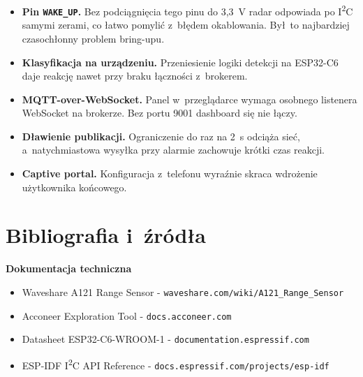 \documentclass[11pt,a4paper]{article}
\begin{document}
\begin{itemize}[leftmargin=1.4em]
  \item \textbf{Pin \texttt{WAKE\_UP}.} Bez podci\k agni\k ecia tego pinu do 3,3~V
        radar odpowiada po I\textsuperscript{2}C samymi zerami, co \l atwo pomyli\'c
        z~b\l \k edem okablowania. By\l\ to najbardziej czasoch\l onny problem bring-upu.
  \item \textbf{Klasyfikacja na urz\k adzeniu.} Przeniesienie logiki detekcji na
        ESP32-C6 daje reakcj\k e nawet przy braku \l \k aczno\'sci z~brokerem.
  \item \textbf{MQTT-over-WebSocket.} Panel w~przegl\k adarce wymaga osobnego
        listenera WebSocket na brokerze. Bez portu 9001 dashboard si\k e nie \l \k aczy.
  \item \textbf{D\l awienie publikacji.} Ograniczenie do raz na 2~s odci\k a\.za sie\'c,
        a~natychmiastowa wysy\l ka przy alarmie zachowuje kr\'otki czas reakcji.
  \item \textbf{Captive portal.} Konfiguracja z~telefonu wyra\'znie skraca
        wdro\.zenie u\.zytkownika ko\'ncowego.
\end{itemize}

\clearpage
\section*{Bibliografia i~\'zr\'od\l a}
\sloppy

\noindent\textbf{Dokumentacja techniczna}
\begin{itemize}[leftmargin=1.4em]
  \item Waveshare A121 Range Sensor - \texttt{waveshare.com/wiki/A121\_Range\_Sensor}
  \item Acconeer Exploration Tool - \texttt{docs.acconeer.com}
  \item Datasheet ESP32-C6-WROOM-1 - \texttt{documentation.espressif.com}
  \item ESP-IDF I\textsuperscript{2}C API Reference - \texttt{docs.espressif.com/projects/esp-idf}
\end{itemize}
\end{document}
